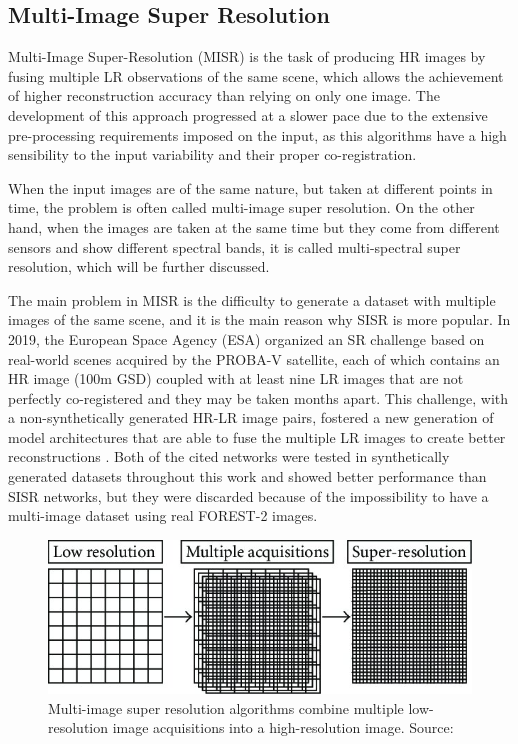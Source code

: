        




    \subsection{Multi-Image Super Resolution}

        Multi-Image Super-Resolution (MISR) is the task of producing HR images by fusing multiple LR observations of the same scene, which allows the achievement of higher reconstruction accuracy than relying on only one image.
        The development of this approach progressed at a slower pace due to the extensive pre-processing requirements imposed on the input, as this algorithms have a high sensibility to the input variability and their proper co-registration.  

        When the input images are of the same nature, but taken at different points in time, the problem is often called multi-image super resolution.
        On the other hand, when the images are taken at the same time but they come from different sensors and show different spectral bands, it is called multi-spectral super resolution, which will be further discussed. 

        The main problem in MISR is the difficulty to generate a dataset with multiple images of the same scene, and it is the main reason why SISR is more popular.
        In 2019, the European Space Agency (ESA) organized an SR challenge  \cite{martens2019superresolution} based on real-world scenes acquired by the PROBA-V satellite, each of which contains an HR image (100m GSD) coupled with at least nine LR images that are not perfectly co-registered and they may be taken months apart. 
        This challenge, with a non-synthetically generated HR-LR image pairs, fostered a new generation of model architectures that are able to fuse the multiple LR images to create better reconstructions \cite{Salvetti_2020,Bordone_Molini_2020}.
         Both of the cited networks were tested in synthetically generated datasets throughout this work and showed better performance than SISR networks, but they were discarded because of the impossibility to have a multi-image dataset using real FOREST-2 images.

        \begin{figure}[H]
            \centering
            \includegraphics[width=\textwidth]{Includes/2-MISR.jpeg}
            \caption{Multi-image super resolution algorithms combine multiple low-resolution image acquisitions into a high-resolution image. Source: \cite{MISR2007}}
            \label{fig:2-MISR}
        \end{figure}
        
